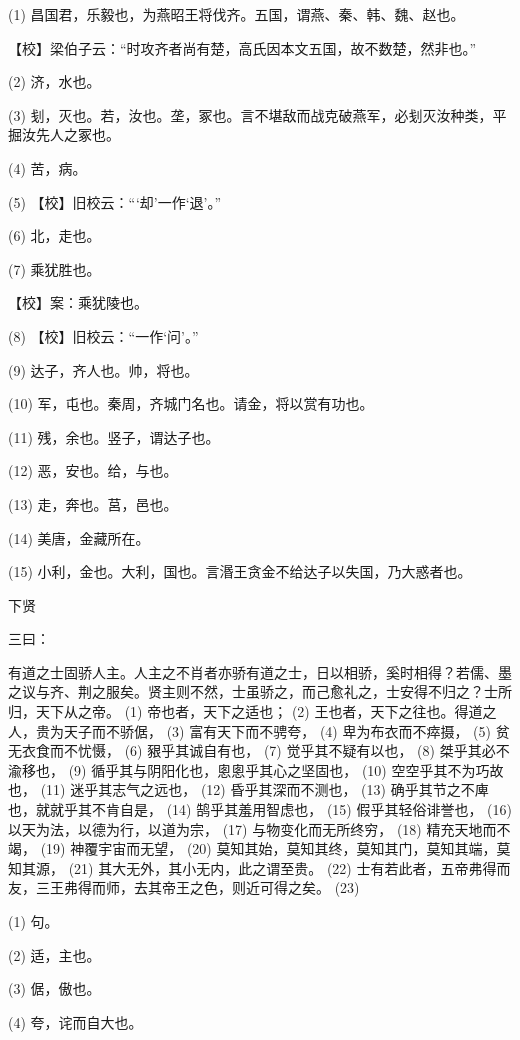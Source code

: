 \documentclass[12pt,UTF8]{ctexbook}
\begin{document}
(1) 昌国君，乐毅也，为燕昭王将伐齐。五国，谓燕、秦、韩、魏、赵也。

【校】梁伯子云：“时攻齐者尚有楚，高氏因本文五国，故不数楚，然非也。”

(2) 济，水也。

(3) 刬，灭也。若，汝也。垄，冢也。言不堪敌而战克破燕军，必刬灭汝种类，平掘汝先人之冢也。

(4) 苦，病。

(5) 【校】旧校云：“‘却’一作‘退’。”

(6) 北，走也。

(7) 乘犹胜也。

【校】案：乘犹陵也。

(8) 【校】旧校云：“一作‘问’。”

(9) 达子，齐人也。帅，将也。

(10) 军，屯也。秦周，齐城门名也。请金，将以赏有功也。

(11) 残，余也。竖子，谓达子也。

(12) 恶，安也。给，与也。

(13) 走，奔也。莒，邑也。

(14) 美唐，金藏所在。

(15) 小利，金也。大利，国也。言湣王贪金不给达子以失国，乃大惑者也。





下贤


三曰：

有道之士固骄人主。人主之不肖者亦骄有道之士，日以相骄，奚时相得？若儒、墨之议与齐、荆之服矣。贤主则不然，士虽骄之，而己愈礼之，士安得不归之？士所归，天下从之帝。 (1) 帝也者，天下之适也； (2) 王也者，天下之往也。得道之人，贵为天子而不骄倨， (3) 富有天下而不骋夸， (4) 卑为布衣而不瘁摄， (5) 贫无衣食而不忧慑， (6) 豤乎其诚自有也， (7) 觉乎其不疑有以也， (8) 桀乎其必不渝移也， (9) 循乎其与阴阳化也，悤悤乎其心之坚固也， (10) 空空乎其不为巧故也， (11) 迷乎其志气之远也， (12) 昏乎其深而不测也， (13) 确乎其节之不庳也，就就乎其不肯自是， (14) 鹄乎其羞用智虑也， (15) 假乎其轻俗诽誉也， (16) 以天为法，以德为行，以道为宗， (17) 与物变化而无所终穷， (18) 精充天地而不竭， (19) 神覆宇宙而无望， (20) 莫知其始，莫知其终，莫知其门，莫知其端，莫知其源， (21) 其大无外，其小无内，此之谓至贵。 (22) 士有若此者，五帝弗得而友，三王弗得而师，去其帝王之色，则近可得之矣。 (23)

(1) 句。

(2) 适，主也。

(3) 倨，傲也。

(4) 夸，诧而自大也。
\end{document}

